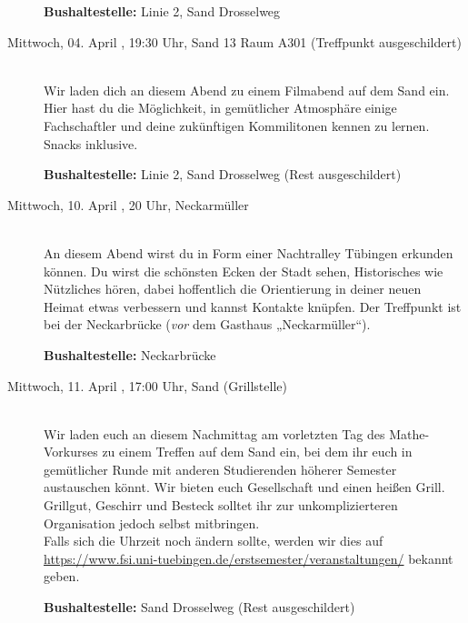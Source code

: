 \begin{description}
\textbf{Bushaltestelle:} Linie 2, Sand Drosselweg
\fi
\fi 

\item[Mittwoch, 04. April \Jahr, 19:30 Uhr, Sand 13 Raum A301 (Treffpunkt ausgeschildert)]\ \\
Wir laden dich an diesem Abend zu einem Filmabend auf dem Sand ein.
Hier hast du die Möglichkeit, in gemütlicher Atmosphäre einige Fachschaftler und deine zukünftigen Kommilitonen kennen zu lernen. Snacks inklusive.

\textbf{Bushaltestelle:} Linie 2, Sand Drosselweg (Rest ausgeschildert) 


\item[Mittwoch, 10. April \Jahr, 20 Uhr, Neckarmüller]\ \\
  An diesem Abend wirst du in Form einer Nachtralley Tübingen erkunden können. Du wirst die schönsten Ecken der Stadt sehen, Historisches wie Nützliches hören, dabei hoffentlich die Orientierung in deiner neuen Heimat etwas verbessern und kannst Kontakte knüpfen. Der Treffpunkt ist bei der Neckarbrücke (\emph{vor} dem Gasthaus „Neckarmüller“).
  
  \textbf{Bushaltestelle:} Neckarbrücke   


\item[Mittwoch, 11. April \Jahr, 17:00 Uhr, Sand (Grillstelle)]\ \\
Wir laden euch an diesem Nachmittag am vorletzten Tag des Mathe-Vorkurses zu
einem Treffen auf dem Sand ein, bei dem ihr euch in gemütlicher Runde mit
anderen Studierenden höherer Semester austauschen könnt. Wir bieten euch
Gesellschaft und einen heißen Grill.
Grillgut, Geschirr und Besteck solltet ihr zur unkomplizierteren Organisation jedoch selbst mitbringen.\\
Falls sich die Uhrzeit noch ändern sollte, werden wir dies auf \\ \url{https://www.fsi.uni-tuebingen.de/erstsemester/veranstaltungen/} bekannt geben.

\textbf{Bushaltestelle:} Sand Drosselweg (Rest ausgeschildert)



\end{description}
